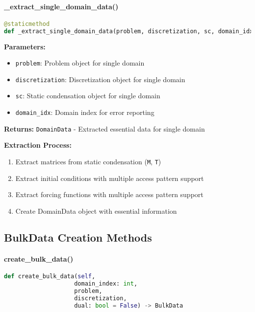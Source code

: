 \paragraph{\_extract\_single\_domain\_data()}\leavevmode
\begin{lstlisting}[language=Python, caption=Single Domain Extraction Method]
@staticmethod
def _extract_single_domain_data(problem, discretization, sc, domain_idx: int) -> DomainData
\end{lstlisting}

\textbf{Parameters:}
\begin{itemize}
    \item \texttt{problem}: Problem object for single domain
    \item \texttt{discretization}: Discretization object for single domain
    \item \texttt{sc}: Static condensation object for single domain
    \item \texttt{domain\_idx}: Domain index for error reporting
\end{itemize}

\textbf{Returns:} \texttt{DomainData} - Extracted essential data for single domain

\textbf{Extraction Process:}
\begin{enumerate}
    \item Extract matrices from static condensation (\texttt{M}, \texttt{T})
    \item Extract initial conditions with multiple access pattern support
    \item Extract forcing functions with multiple access pattern support
    \item Create DomainData object with essential information
\end{enumerate}

\subsection{BulkData Creation Methods}
\label{subsec_bulk_data_creation}

\paragraph{create\_bulk\_data()}\leavevmode
\begin{lstlisting}[language=Python, caption=Create BulkData Method]
def create_bulk_data(self, 
                    domain_index: int, 
                    problem, 
                    discretization, 
                    dual: bool = False) -> BulkData
\end{lstlisting}

